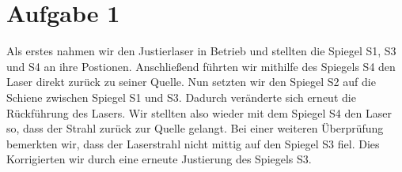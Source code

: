 \section{Aufgabe 1}

Als erstes nahmen wir den Justierlaser in Betrieb und stellten die Spiegel S1, S3 und S4 an ihre Postionen. Anschließend führten wir mithilfe des Spiegels S4 den Laser direkt zurück zu seiner Quelle. Nun setzten wir den Spiegel S2 auf die Schiene zwischen Spiegel S1 und S3. Dadurch veränderte sich erneut die Rückführung des Lasers. Wir stellten also wieder mit dem Spiegel S4 den Laser so, dass der Strahl zurück zur Quelle gelangt. Bei einer weiteren Überprüfung bemerkten wir, dass der Laserstrahl nicht mittig auf den Spiegel S3 fiel. Dies Korrigierten wir durch eine erneute Justierung des Spiegels S3. 